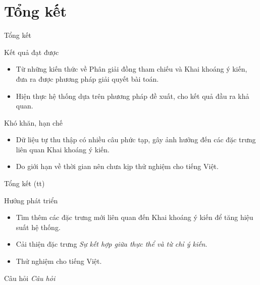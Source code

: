 \documentclass[9pt,xcolor=table,hyperref=unicode]{beamer}
\begin{document}
	\section{Tổng kết}
		\begin{frame}{Tổng kết}			
			\begin{block}{Kết quả đạt được}
				\begin{itemize}
					\item Từ những kiến thức về Phân giải đồng tham chiếu và Khai khoáng ý kiến, đưa ra được phương pháp giải quyết bài toán.
					\item Hiện thực hệ thống dựa trên phương pháp đề xuất, cho kết quả đầu ra khả quan.				
				\end{itemize}
			\end{block}
			\begin{block}{Khó khăn, hạn chế}
				\begin{itemize}
					\item Dữ liệu tự thu thập có nhiều câu phức tạp, gây ảnh hưởng đến các đặc trưng liên quan Khai khoáng ý kiến. 
					\item Do giới hạn về thời gian nên chưa kịp thử nghiệm cho tiếng Việt.				
				\end{itemize}
			\end{block}
		\end{frame}
	
		\begin{frame}{Tổng kết (tt)}			
			\begin{block}{Hướng phát triển}
				\begin{itemize}
					\item Tìm thêm các đặc trưng mới liên quan đến Khai khoáng ý kiến để tăng hiệu suất hệ thống.
					\item Cải thiện đặc trưng \textit{Sự kết hợp giữa thực thể và từ chỉ ý kiến}.
					\item Thử nghiệm cho tiếng Việt.
				\end{itemize}
			\end{block}
		\end{frame}

		\begin{frame}{Câu hỏi}
			\Huge
			\centering
			\fontsize{30pt}{30}\selectfont
			\textit{Câu hỏi}
		\end{frame}
\end{document}
